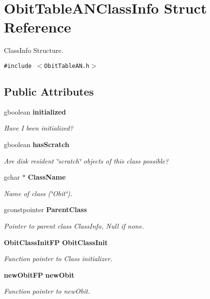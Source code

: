 \section{Obit\-Table\-ANClass\-Info Struct Reference}
\label{structObitTableANClassInfo}
Class\-Info Structure.  


{\tt \#include $<$Obit\-Table\-AN.h$>$}

\subsection*{Public Attributes}
\begin{CompactItemize}
\item 
gboolean {\bf initialized}
\begin{CompactList}\small\item\em Have I been initialized? \item\end{CompactList}\item 
gboolean {\bf has\-Scratch}
\begin{CompactList}\small\item\em Are disk resident \char`\"{}scratch\char`\"{} objects of this class possible? \item\end{CompactList}\item 
gchar $\ast$ {\bf Class\-Name}
\begin{CompactList}\small\item\em Name of class (\char`\"{}Obit\char`\"{}). \item\end{CompactList}\item 
gconstpointer {\bf Parent\-Class}
\begin{CompactList}\small\item\em Pointer to parent class Class\-Info, Null if none. \item\end{CompactList}\item 
{\bf Obit\-Class\-Init\-FP} {\bf Obit\-Class\-Init}
\begin{CompactList}\small\item\em Function pointer to Class initializer. \item\end{CompactList}\item 
{\bf new\-Obit\-FP} {\bf new\-Obit}
\begin{CompactList}\small\item\em Function pointer to new\-Obit. \item\end{CompactList}\item 

\end{CompactItemize}
